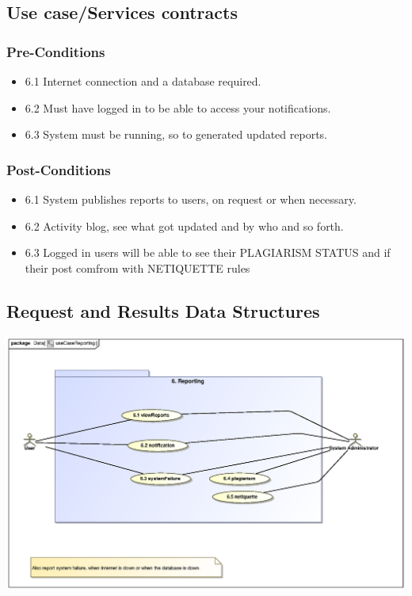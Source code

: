 \documentclass[hidelinks, 12pt, oneside]{article}
\begin{document}
\subsection{Use case/Services contracts}
\subsubsection{Pre-Conditions}								%
\begin{itemize}
  \item 6.1 Internet connection and a database required.
  \item 6.2 Must have logged in to be able to access your notifications.
  \item 6.3 System must be running, so to generated updated reports.

\end{itemize}

\subsubsection{Post-Conditions}%
\begin{itemize}
  \item 6.1 System publishes reports to users, on request or when necessary.
  \item 6.2 Activity blog, see what got updated and by who and so forth.
  \item 6.3 Logged in users will be able to see their PLAGIARISM STATUS and if their post comfrom with NETIQUETTE rules
\end{itemize}

\subsection{Request and Results Data Structures} 
\includegraphics[scale=.9]{Hlavutelo/graphics/useCaseReporting.eps}\\
\end{document}
